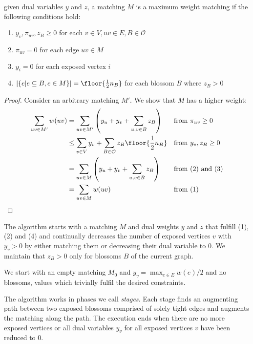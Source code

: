 \begin{theorem}\label{thm:conditions}
    given dual variables $y$ and $z$, a matching $M$ is a maximum weight matching if the following conditions hold:

    \begin{enumerate}
        \item $y_v, \pi_{uv}, z_B \geq 0$ for each $v \in V, uv \in E, B \in \mathcal{O}$
        \item $\pi_{uv} = 0$ for each edge $uv \in M$
        \item $y_i = 0$ for each exposed vertex $i$
        \item $|\{e | e \subseteq B, e \in M\}| = \floor{\frac{1}{2}n_B}$ for each blossom $B$ where $z_B > 0$
    \end{enumerate}
\end{theorem}

\begin{proof}
Consider an arbitrary matching $M'$. We show that $M$ has a higher weight:
\begin{align*}
    \sum_{uv \in M'} w(uv) &= \sum_{uv \in M'} \left( y_u + y_v + \sum_{u, v \in B} z_B \right) && \text{from } \pi_{uv} \geq 0 \\
    &\leq \sum_{v \in V} y_v + \sum_{B \in \mathcal{O}} z_B\floor{\frac{1}{2}n_B} && \text{from } y_v, z_B \geq 0 \\
    &= \sum_{uv \in M} \left( y_u + y_v + \sum_{u, v \in B} z_B \right) && \text{from (2) and (3)}\\
    &= \sum_{uv \in M} w(uv) && \text{from (1)}\\
\end{align*}
\end{proof}

The algorithm starts with a matching $M$ and dual weights $y$ and $z$ that fulfill (1), (2) and (4) and continually decreases the number of exposed vertices $v$ with $y_v > 0$ by either matching them or decreasing their dual variable to $0$. We maintain that $z_B > 0$ only for blossoms $B$ of the current graph.

We start with an empty matching $M_0$ and $y_v = \max_{e \in E} w(e)/2$ and no blossoms, values which trivially fulfil the desired constraints.

The algorithm works in phases we call \textit{stages}. Each stage finds an augmenting path between two exposed blossoms comprised of solely tight edges and augments the matching along the path. The execution ends when there are no more exposed vertices or all dual variables $y_v$ for all exposed vertices $v$ have been reduced to $0$.


